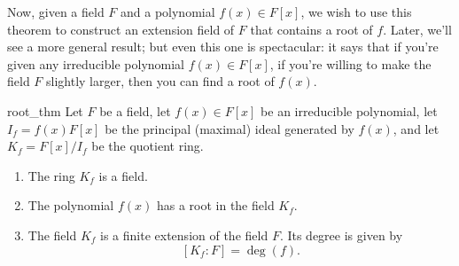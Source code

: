 \documentclass[math1530-lecture-notes]{subfiles}
\begin{document}
Now, given a field $F$ and a polynomial $f(x)\in F[x]$, we wish to use this theorem to construct an
extension field of $F$ that contains a root of $f$. Later, we'll see a more general result; but even
this one is spectacular: it says that if you're given any irreducible polynomial $f(x)\in F[x]$, if
you're willing to make the field $F$ slightly larger, then you can find a root of $f(x)$.

\begin{theorem}{root_thm}
  Let $F$ be a field, let $f(x)\in F[x]$ be an irreducible polynomial, let $I_f=f(x)F[x]$ be the
  principal (maximal) ideal generated by $f(x)$, and let $K_f=F[x] / I_f$ be the quotient ring.
  \begin{enumerate}
    \item The ring $K_f$ is a field.
    \item The polynomial $f(x)$ has a root in the field $K_f$.
    \item The field $K_f$ is a finite extension of the field $F$. Its degree is given by \[
        \left[K_f : F\right]=\deg(f)
    .\] 
  \end{enumerate}
\end{theorem}
\end{document}
